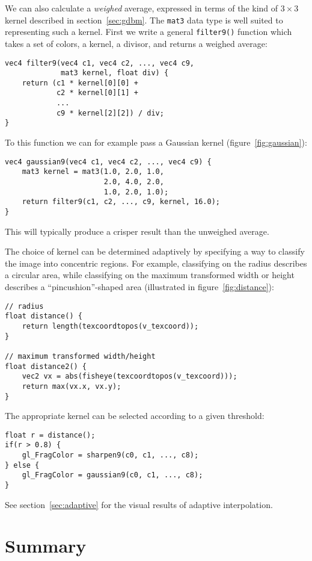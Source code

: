 \documentclass[english,12pt]{ifimaster}
\begin{document}
We can also calculate a \emph{weighed} average, expressed in terms of
the kind of $3 \times 3$ kernel described in section~\ref{sec:gdbm}.
The \lstinline|mat3| data type is well suited to representing such a
kernel. First we write a general \lstinline|filter9()| function which
takes a set of colors, a kernel, a divisor, and returns a weighed
average:
\begin{lstlisting}[frame=lines,label=lst:filtering,caption=Filtering function]
vec4 filter9(vec4 c1, vec4 c2, ..., vec4 c9,
             mat3 kernel, float div) {
    return (c1 * kernel[0][0] +
            c2 * kernel[0][1] +
            ...
            c9 * kernel[2][2]) / div;
}
\end{lstlisting}
To this function we can for example pass a Gaussian kernel
(figure~\ref{fig:gaussian}):
\begin{lstlisting}[frame=lines,label=lst:gaussian,caption=Filtering function]
vec4 gaussian9(vec4 c1, vec4 c2, ..., vec4 c9) {
    mat3 kernel = mat3(1.0, 2.0, 1.0,
                       2.0, 4.0, 2.0,
                       1.0, 2.0, 1.0);
    return filter9(c1, c2, ..., c9, kernel, 16.0);
}
\end{lstlisting}
This will typically produce a crisper result than the unweighed
average.

The choice of kernel can be determined adaptively by specifying a way
to classify the image into concentric regions. For example,
classifying on the radius describes a circular area, while classifying
on the maximum transformed width or height describes a
``pincushion''-shaped area (illustrated in figure~\ref{fig:distance}):
\begin{lstlisting}[frame=lines,label=lst:distance,caption=Distance measure]
// radius
float distance() {
    return length(texcoordtopos(v_texcoord));
}

// maximum transformed width/height
float distance2() {
    vec2 vx = abs(fisheye(texcoordtopos(v_texcoord)));
    return max(vx.x, vx.y);
}
\end{lstlisting}
The appropriate kernel can be selected according to a given threshold:
\begin{lstlisting}[frame=lines,label=lst:adaptive,caption=Adaptive interpolation]
float r = distance();
if(r > 0.8) {
    gl_FragColor = sharpen9(c0, c1, ..., c8);
} else {
    gl_FragColor = gaussian9(c0, c1, ..., c8);
}
\end{lstlisting}
See section~\ref{sec:adaptive} for the visual results of adaptive
interpolation.

\section*{Summary}
\end{document}
